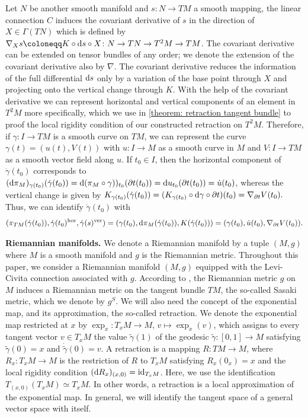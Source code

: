 \documentclass[11pt,a4paper]{article}
\theoremstyle{plain}
\theoremstyle{definition}
\newcommand{\hor}{\operatorname{hor}}
\newcommand{\ver}{\operatorname{ver}}
\begin{document}
Let $N$ be another smooth manifold and $s\colon N\to TM$ a smooth mapping, the linear connection $C$ induces the covariant derivative of $s$ in the direction of $X\in\Gamma(TN)$ which is defined by $\nabla_X s\coloneqq K\circ \textup{d}s\circ X\colon N\to TN\to T^2M\to TM$. The covariant derivative can be extended on tensor bundles of any order; we denote the extension of the covariant derivative also by  $\nabla$. The covariant derivative reduces the information of the full differential $\textup{d}s$ only by a variation of the base point through $X$ and projecting onto the vertical change through $K$. With the help of the covariant derivative we can represent horizontal and vertical components of an element in $T^2M$ more specifically, which we  use in \cref{theorem: retraction tangent bundle} to proof the local rigidity condition of our constructed retraction on $T^2M$.
Therefore, if $\gamma\colon I\to TM$  is a smooth curve on $TM$, we can represent the curve $\gamma(t) = (u(t), V(t))$ with $u\colon I\to M$ as a smooth curve in $M$ and $V\colon I\to TM$ as a smooth vector field along $u$. 
If $t_0\in I$, then the horizontal component of $\dot{\gamma}(t_0)$ corresponds to
$
(\textup{d}\pi_M)_{\gamma(t_0)}(\dot{\gamma}(t_0))
= \textup{d}(\pi_M\circ \gamma))_{t_0}(\partial t(t_0))
= \textup{d}u_{t_0}(\partial t(t_0))
= \dot{u}(t_0)
$,
whereas the vertical change is given by
$
K_{\gamma(t_0)}(\dot{\gamma}(t_0))
= (K_{\gamma(t_0)}\circ \textup{d}\gamma \circ \partial t)(t_0)
= \nabla_{\partial t} V(t_0).
$
Thus, we can identify $\dot{\gamma}(t_0)$ with
\begin{equation}
	\label{eq: ver_hor_identification}
	(\pi_{TM}(\dot{\gamma}(t_0)), \dot{\gamma}(t_0)^{\hor}, \dot{\gamma}(s)^{\ver})
	= (\gamma(t_0), \textup{d}\pi_M(\dot{\gamma}(t_0)), K(\dot{\gamma}(t_0)))
	= (\gamma(t_0), \dot{u}(t_0), \nabla_{\partial t} V(t_0)).
\end{equation}

\textbf{Riemannian manifolds.}
We denote a Riemannian manifold by a tuple $(M, g)$ where $M$ is a smooth manifold and $g$ is the Riemannian metric. Throughout this paper, we consider a Riemannian manifold $(M, g)$ equipped with the Levi-Civita connection associated with $g$. According to \cite{sasaki1958}, the Riemannian metric $g$ on $M$ induces a Riemannian metric on the tangent bundle $TM$, the so-called Sasaki metric, which we denote by $g^S$. We will also need the concept of the exponential map, and its approximation, the so-called retraction. We denote the exponential map restricted at $x$ by $\exp_{x}\colon T_{x}M \to M,\,v\mapsto \exp_{x}(v)$, which assigns to every tangent vector $v\in T_xM$ the value $\tilde{\gamma}(1)$ of the geodesic $\tilde{\gamma}\colon [0,1]\to M$ satisfying $\tilde{\gamma}(0) = x$ and $\dot{\tilde{\gamma}}(0) = v.$ A retraction is a mapping $R\colon TM\to M$, where $R_x\colon T_x M\to M$ is the restriction of $R$ to $T_xM$ satisfying $R_x(0_x)=x$ and the local rigidity condition $(\textup{d}R_x)_{(x, 0)}=\text{id}_{T_xM}$. Here, we use the identification $T_{(x, 0)}(T_xM)\simeq T_xM$. In other words, a retraction is a local approximation of the exponential map. In general, we will identify the tangent space of a general vector space with itself.
\end{document}
